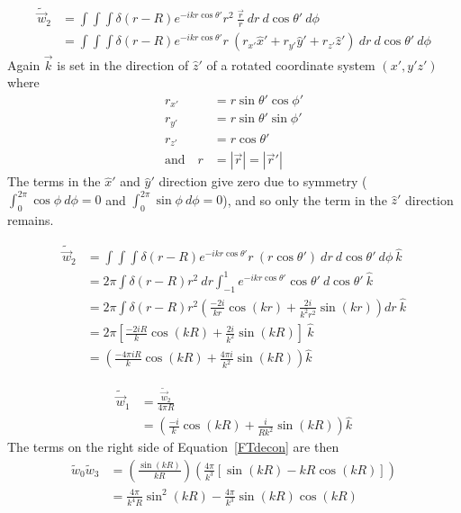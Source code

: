 \documentclass[double,12pt]{beavtex}
\begin{document}
\begin{align}
    \widetilde{\vec w}_2  &= \int\int\int\delta(r-R)e^{-ikr\cos \theta'}r^2~\frac{\vec r}{r}~dr~d\cos\theta'~d\phi \nonumber  \\
                          &= \int\int\int\delta(r-R)e^{-ikr\cos \theta'}r~(r_{x'} \hat x' + r_{y'} \hat y'+ r_{z'} \hat z')~dr~d\cos\theta'~d\phi  
\end{align}
Again $\vec{k}$ is set in the direction of $\hat{z}'$ of a rotated coordinate 
system $(x',y'z')$ where
\begin{align}
     r_{x'} &= r\sin\theta'\cos\phi'  \\
     r_{y'} &= r\sin\theta'\sin\phi'   \\
     r_{z'} &= r\cos\theta'  \\
     \text{and~~~} r &=|\vec r| = |\vec r'|
\end{align}
The terms in the $\hat x'$ and $\hat y'$ direction give zero due to symmetry ($\int_0^{2\pi} \cos \phi ~d\phi= 0$ and $\int_0^{2\pi} \sin \phi~d\phi= 0$), 
and so only the term in the $\hat z'$ direction remains.

\begin{align}
    \widetilde{\vec w}_2  &= \int\int\int\delta(r-R)e^{-ikr\cos \theta'}r~(r\cos \theta')~dr~d\cos\theta'~d\phi~\hat k  \nonumber  \\
                          &= 2\pi\int\delta(r-R)r^2~dr\int_{-1}^1 e^{-ikr\cos \theta'}\cos \theta'~d\cos\theta'~\hat k  \nonumber  \\
                          &= 2\pi\int\delta(r-R)r^2 \left(\frac{-2i}{kr}\cos (kr)+ \frac{2i}{k^2r^2}\sin (kr)\right)dr~\hat k  \nonumber  \\
                          &= 2\pi\left[\frac{-2iR}{k}\cos (kR)+ \frac{2i}{k^2}\sin (kR)\right]~\hat k \nonumber   \\
                          &= \left(\frac{-4\pi iR}{k}\cos (kR)+ \frac{4\pi i}{k^2}\sin (kR)\right)\hat k 
\end{align}

\begin{align}
    \widetilde{\vec w}_1  &= \frac{\widetilde{\vec w}_2}{4\pi R}  \nonumber  \\
                          &= \left(\frac{-i}{k}\cos (kR)+ \frac{i}{Rk^2}\sin (kR)\right)\hat k
\end{align}
The terms on the right side of Equation~\ref{FTdecon} are then
\begin{align}
    \widetilde{w}_0\widetilde{w}_3 &= \left(\frac{\sin (kR)}{kR}\right)\left(\frac{4\pi}{k^3}\left[\sin (kR) - kR\cos (kR)\right]\right) \nonumber  \\
                                   &= \frac{4\pi}{k^4R}\sin^2 (kR) - \frac{4\pi}{k^3}\sin(kR)\cos(kR)
\end{align}
\end{document}
